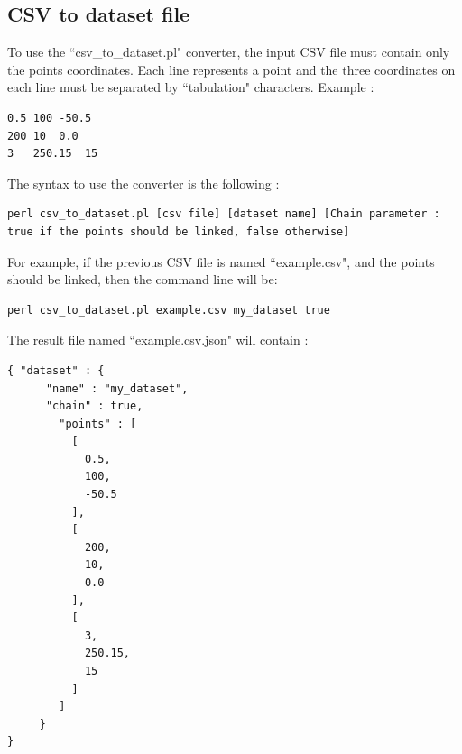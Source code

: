 \documentclass{bioinfo}
\begin{document}
\subsection{CSV to dataset file}
To use the ``csv\_to\_dataset.pl" converter, the input CSV file must contain only the points coordinates. Each line represents a point and the three coordinates on each line must be separated by ``tabulation" characters. Example :
\begin{lstlisting}
0.5	100	-50.5
200	10	0.0
3	250.15	15
\end{lstlisting}
The syntax to use the converter is the following :
\begin{lstlisting}
perl csv_to_dataset.pl [csv file] [dataset name] [Chain parameter : true if the points should be linked, false otherwise]
\end{lstlisting}
For example, if the previous CSV file is named ``example.csv", and the points should be linked, then the command line will be:
\begin{lstlisting}
perl csv_to_dataset.pl example.csv my_dataset true
\end{lstlisting}
The result file named ``example.csv.json" will contain :
\begin{lstlisting}
{ "dataset" : {
      "name" : "my_dataset",
      "chain" : true,
        "points" : [
          [
            0.5,
            100,
            -50.5
          ],
          [
            200,
            10,
            0.0
          ],
          [
            3,
            250.15,
            15
          ]
        ]
     }
}
\end{lstlisting}
\end{document}

